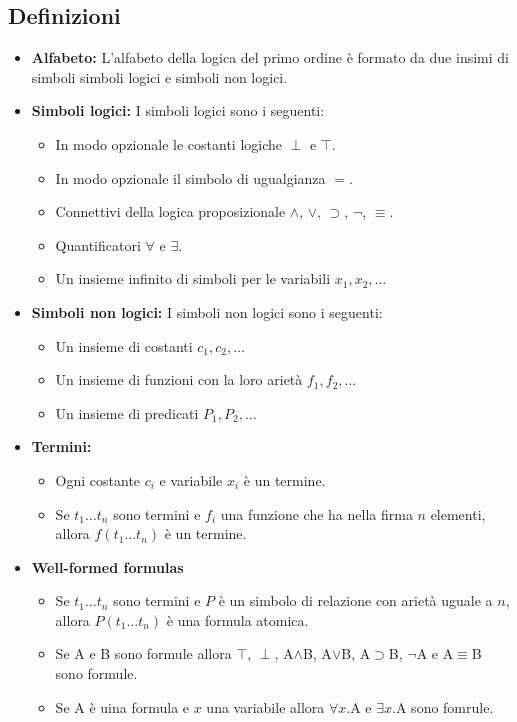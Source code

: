 \documentclass[../main.tex]{subfiles}
\begin{document}
   \subsection{Definizioni}
   \begin{itemize}
      \item \textbf{Alfabeto:} L'alfabeto della logica del primo ordine è formato da due insimi di simboli simboli logici e simboli non logici.
      \item \textbf{Simboli logici:} I simboli logici sono i seguenti:
         \begin{itemize}
            \item In modo opzionale le costanti logiche $\perp$ e $\top$.
            \item In modo opzionale il simbolo di ugualgianza $=$.
            \item Connettivi della logica proposizionale $\land$, $\lor$, $\supset$, $\lnot$, $\equiv$.
            \item Quantificatori $\forall$ e $\exists$.
            \item Un insieme infinito di simboli per le variabili $x_1, x_2, \dots$
         \end{itemize}
      \item \textbf{Simboli non logici:} I simboli non logici sono i seguenti:
         \begin{itemize}
            \item Un insieme di costanti $c_1, c_2, \dots$
            \item Un insieme di funzioni con la loro arietà $f_1, f_2, \dots$
            \item Un insieme di predicati $P_1, P_2, \dots$
         \end{itemize}
      \item \textbf{Termini:}
         \begin{itemize}
            \item Ogni costante $c_i$ e variabile $x_i$ è un termine.
            \item Se $t_1 \dots t_n$ sono termini e $f_i$ una funzione che ha nella firma $n$ elementi, allora $f(t_1 \dots t_n)$ è un termine.
         \end{itemize}
      \item \textbf{Well-formed formulas}
         \begin{itemize}
            \item Se $t_1 \dots t_n$ sono termini e $P$ è un simbolo di relazione con arietà uguale a $n$, allora $P(t_1 \dots t_n)$ è una formula atomica.
            \item Se A e B sono formule allora $\top$, $\perp$, A$\land$B, A$\lor$B, A$\supset$B, $\lnot$A e A$\equiv$B sono formule.
            \item Se A è uina formula e $x$ una variabile allora $\forall x$.A e $\exists x$.A sono fomrule.
         \end{itemize}
   \end{itemize}
\end{document}
